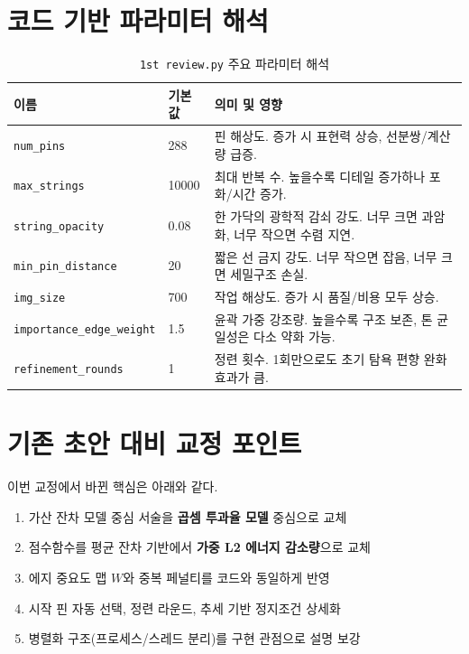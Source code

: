 \documentclass[11pt,a4paper]{article}
\begin{document}
\section{코드 기반 파라미터 해석}
\begin{table}[H]
\centering
\begin{tabular}{>{\raggedright\arraybackslash}p{3.1cm} p{2.5cm} p{7.8cm}}
\toprule
이름 & 기본값 & 의미 및 영향 \\
\midrule
\texttt{num\_pins} & 288 & 핀 해상도. 증가 시 표현력 상승, 선분쌍/계산량 급증. \\
\texttt{max\_strings} & 10000 & 최대 반복 수. 높을수록 디테일 증가하나 포화/시간 증가. \\
\texttt{string\_opacity} & 0.08 & 한 가닥의 광학적 감쇠 강도. 너무 크면 과암화, 너무 작으면 수렴 지연. \\
\texttt{min\_pin\_distance} & 20 & 짧은 선 금지 강도. 너무 작으면 잡음, 너무 크면 세밀구조 손실. \\
\texttt{img\_size} & 700 & 작업 해상도. 증가 시 품질/비용 모두 상승. \\
\texttt{importance\_edge\_weight} & 1.5 & 윤곽 가중 강조량. 높을수록 구조 보존, 톤 균일성은 다소 약화 가능. \\
\texttt{refinement\_rounds} & 1 & 정련 횟수. 1회만으로도 초기 탐욕 편향 완화 효과가 큼. \\
\bottomrule
\end{tabular}
\caption{\texttt{1st review.py} 주요 파라미터 해석}
\end{table}

\section{기존 초안 대비 교정 포인트}
이번 교정에서 바뀐 핵심은 아래와 같다.
\begin{enumerate}
  \item 가산 잔차 모델 중심 서술을 \textbf{곱셈 투과율 모델} 중심으로 교체
  \item 점수함수를 평균 잔차 기반에서 \textbf{가중 L2 에너지 감소량}으로 교체
  \item 에지 중요도 맵 \(W\)와 중복 페널티를 코드와 동일하게 반영
  \item 시작 핀 자동 선택, 정련 라운드, 추세 기반 정지조건 상세화
  \item 병렬화 구조(프로세스/스레드 분리)를 구현 관점으로 설명 보강
\end{enumerate}
\end{document}
